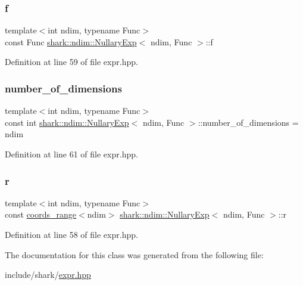 \hypertarget{classshark_1_1ndim_1_1_nullary_exp_a30f367c05cd7978aedec0a99ca82ed0e}{}\label{classshark_1_1ndim_1_1_nullary_exp_a30f367c05cd7978aedec0a99ca82ed0e} 
\subsubsection{\texorpdfstring{f}{f}}
{\footnotesize\ttfamily template$<$int ndim, typename Func$>$ \\
const Func \hyperlink{classshark_1_1ndim_1_1_nullary_exp}{shark\+::ndim\+::\+Nullary\+Exp}$<$ ndim, Func $>$\+::f\hspace{0.3cm}{\ttfamily [private]}}



Definition at line 59 of file expr.\+hpp.

\hypertarget{classshark_1_1ndim_1_1_nullary_exp_ae586c786daf51061eb41615d208b2c12}{}\label{classshark_1_1ndim_1_1_nullary_exp_ae586c786daf51061eb41615d208b2c12} 
\subsubsection{\texorpdfstring{number\+\_\+of\+\_\+dimensions}{number\_of\_dimensions}}
{\footnotesize\ttfamily template$<$int ndim, typename Func$>$ \\
const int \hyperlink{classshark_1_1ndim_1_1_nullary_exp}{shark\+::ndim\+::\+Nullary\+Exp}$<$ ndim, Func $>$\+::number\+\_\+of\+\_\+dimensions = ndim\hspace{0.3cm}{\ttfamily [static]}}



Definition at line 61 of file expr.\+hpp.

\hypertarget{classshark_1_1ndim_1_1_nullary_exp_a2ab3c895de1618318f8864c90cd7b21e}{}\label{classshark_1_1ndim_1_1_nullary_exp_a2ab3c895de1618318f8864c90cd7b21e} 
\subsubsection{\texorpdfstring{r}{r}}
{\footnotesize\ttfamily template$<$int ndim, typename Func$>$ \\
const \hyperlink{structshark_1_1ndim_1_1coords__range}{coords\+\_\+range}$<$ndim$>$ \hyperlink{classshark_1_1ndim_1_1_nullary_exp}{shark\+::ndim\+::\+Nullary\+Exp}$<$ ndim, Func $>$\+::r\hspace{0.3cm}{\ttfamily [private]}}



Definition at line 58 of file expr.\+hpp.



The documentation for this class was generated from the following file\+:\begin{DoxyCompactItemize}
\item 
include/shark/\hyperlink{expr_8hpp}{expr.\+hpp}\end{DoxyCompactItemize}
